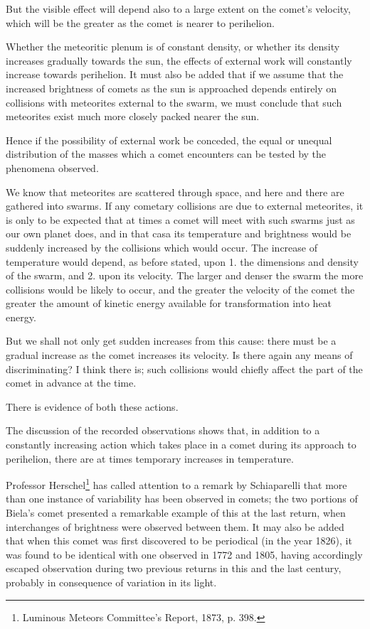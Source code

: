 \documentclass[a4paper, 12pt, oneside, polutonikogreek, english]{article}
\begin{document}
But the visible effect will depend also to a large extent on the comet's velocity, which will be the greater as the comet is nearer to perihelion.

Whether the meteoritic plenum is of constant density, or whether its density increases gradually towards the sun, the effects of external work will constantly increase towards perihelion. It must also be added that if we assume that the increased brightness of comets as the sun is approached depends entirely on collisions with meteorites external to the swarm, we must conclude that such meteorites exist much more closely packed nearer the sun.

Hence if the possibility of external work be conceded, the equal or unequal distribution of the masses which a comet encounters can be tested by the phenomena observed.

We know that meteorites are scattered through space, and here and there are gathered into swarms. If any cometary collisions are due to external meteorites, it is only to be expected that at times a comet will meet with such swarms just as our own planet does, and in that casa its temperature and brightness would be suddenly increased by the collisions which would occur. The increase of temperature would depend, as before stated, upon 1. the dimensions and density of the swarm, and 2. upon its velocity. The larger and denser the swarm the more collisions would be likely to occur, and the greater the velocity of the comet the greater the amount of kinetic energy available for transformation into heat energy.

But we shall not only get sudden increases from this cause: there must be a gradual increase as the comet increases its velocity. Is there again any means of discriminating? I think there is; such collisions would chiefly affect the part of the comet in advance at the time.

There is evidence of both these actions.

The discussion of the recorded observations shows that, in addition to a constantly increasing action which takes place in a comet during its approach to perihelion, there are at times temporary increases in temperature.

Professor Herschel\footnote{Luminous Meteors Committee's Report, 1873, p. 398.} has called attention to a remark by Schiaparelli that more than one instance of variability has been observed in comets; the two portions of Biela's comet presented a remarkable example of this at the last return, when interchanges of brightness were observed between them. It may also be added that when this comet was first discovered to be periodical (in the year 1826), it was found to be identical with one observed in 1772 and 1805, having accordingly escaped observation during two previous returns in this and the last century, probably in consequence of variation in its light.
\end{document}
